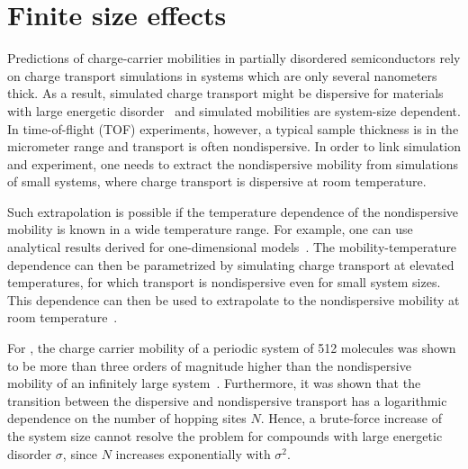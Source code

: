 \section{Finite size effects}
\label{sec:nondispersive}
Predictions of charge-carrier mobilities in partially disordered semiconductors  rely on charge transport simulations in systems which are only several nanometers thick. As a result, simulated charge transport might be dispersive for materials with large energetic disorder~\cite{scher_anomalous_1975,borsenberger_role_1993} and simulated mobilities are system-size dependent. In time-of-flight (TOF) experiments, however, a typical sample thickness is in the micrometer range and transport is often nondispersive. In order to link simulation and experiment, one needs to extract the nondispersive mobility from simulations of small systems, where charge transport is dispersive at room temperature.

Such extrapolation is possible if the temperature dependence of the nondispersive mobility is known in a wide temperature range. For example, one can use analytical results derived for one-dimensional models~\cite{derrida_velocity_1983,cordes_one-dimensional_2001,seki_electric_2001}. The mobility-temperature dependence can then be parametrized by simulating charge transport at elevated temperatures, for which transport is nondispersive even for small system sizes. This dependence can then be used to extrapolate to the nondispersive mobility at room temperature~\cite{lukyanov_extracting_2010}.

For \Alq, the charge carrier mobility of a periodic system of 512 molecules was shown to be more than three orders of magnitude higher than the nondispersive mobility of an infinitely large system~\cite{lukyanov_extracting_2010}. Furthermore, it was shown that the transition between the dispersive and nondispersive transport has a logarithmic dependence on the number of hopping sites $N$. Hence, a brute-force increase of the system size cannot resolve the problem for compounds with large energetic disorder $\sigma$, since $N$ increases exponentially with $\sigma^2$.
 

